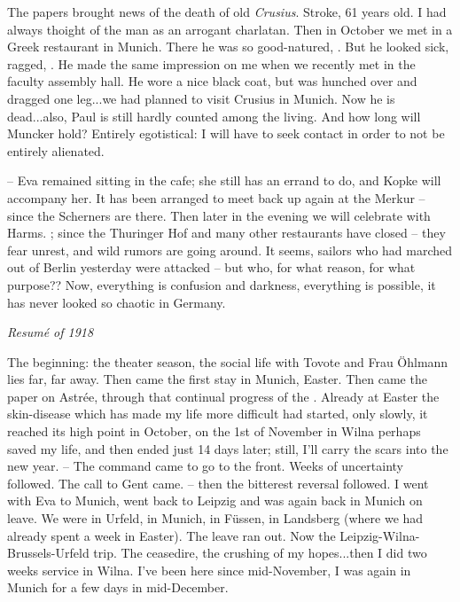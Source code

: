
The papers brought news of the death of old \textit{Crusius}. Stroke, 61 years old. I had always thoight of the man as an arrogant charlatan. Then in October we met in a Greek restaurant in Munich. There he was so good-natured, . But he looked sick, ragged, . He made the same impression on me when we recently met in the faculty assembly hall. He wore a nice black coat, but was hunched over and dragged one leg...we had planned to visit Crusius in Munich. Now he is dead...also, Paul is still hardly counted among the living. And how long will Muncker hold? Entirely egotistical: I will have to seek contact in order to not be entirely alienated.

-- Eva remained sitting in the cafe; she still has an errand to do, and Kopke will accompany her. It has been arranged to meet back up again at the Merkur -- since the Scherners are there. Then later in the evening we will celebrate with Harms. ; since the Thuringer Hof and many other restaurants have closed -- they fear unrest, and wild rumors are going around. It seems, sailors who had marched out of Berlin yesterday were attacked -- but who, for what reason, for what purpose?? Now, everything is confusion and darkness, everything is possible, it has never looked so chaotic in Germany.

\missing

\textit{Resumé of 1918}

The beginning: the theater season, the social life with Tovote and Frau Öhlmann lies far, far away. Then came the first stay in Munich, Easter. Then came the paper on Astrée, through that continual progress of the . Already at Easter the skin-disease which has made my life more difficult had started, only slowly, it reached its high point in October, on the 1st of November in Wilna perhaps saved my life, and then ended just 14 days later; still, I'll carry the scars into the new year. -- The command came to go to the front. Weeks of uncertainty followed. The call to Gent came.  -- then the bitterest reversal followed. I went with Eva to Munich, went back to Leipzig and was again back in Munich on leave. We were in Urfeld, in Munich, in Füssen, in Landsberg (where we had already spent a week in Easter). The leave ran out. Now the Leipzig-Wilna-Brussels-Urfeld trip. The ceasedire, the crushing of my hopes...then I did two weeks service in Wilna. I've been here since mid-November, I was again in Munich for a few days in mid-December.

